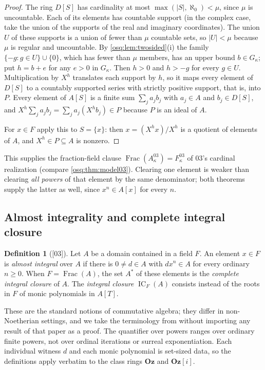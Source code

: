 \documentclass[11pt,letterpaper]{article}
\numberwithin{equation}{section}
\theoremstyle{definition}
\newtheorem{definition}[definition]{Definition}
\theoremstyle{remark}
\theoremstyle{plain}
\newcommand{\Oz}{\mathbf{Oz}}
\newcommand{\GOz}{\Oz[i]}
\newcommand{\Frac}{\operatorname{Frac}}
\newcommand{\IC}{\operatorname{IC}}
\newcommand{\src}[1]{\textup{\textsf{[#1]}}}
\begin{document}
\begin{proof}
The ring $D[S]$ has cardinality at most $\max(|S|,\aleph_0)<\mu$, since $\mu$ is
uncountable. Each of its elements has countable support (in the complex case, take the
union of the supports of the real and imaginary coordinates). The union $U$ of these
supports is a union of fewer than $\mu$ countable sets, so $|U|<\mu$ because $\mu$ is
regular and uncountable. By \cref{osq:lem:twosided}(i) the family
$\{-g:g\in U\}\cup\{0\}$, which has fewer than $\mu$ members, has an upper bound
$b\in G_\kappa$; put $h=b+e$ for any $e>0$ in $G_\kappa$. Then $h>0$ and $h>-g$ for every
$g\in U$. Multiplication by $X^h$ translates each support by $h$, so it maps every element
of $D[S]$ to a countably supported series with strictly positive support, that is, into
$P$. Every element of $A[S]$ is a finite sum $\sum_ja_jb_j$ with $a_j\in A$ and
$b_j\in D[S]$, and $X^h\sum_ja_jb_j=\sum_ja_j(X^hb_j)\in P$ because $P$ is an ideal of $A$.

For $x\in F$ apply this to $S=\{x\}$: then $x=(X^hx)/X^h$ is a quotient of elements of
$A$, and $X^h\in P\subseteq A$ is nonzero.
\end{proof}

This supplies the fraction-field clause $\Frac(A^{03}_\kappa)=F^{03}_\kappa$ of 03's
cardinal realization (compare \cref{osq:thm:model03}). Clearing one element is weaker than
clearing \emph{all powers} of that element by the same denominator; both theorems supply
the latter as well, since $x^n\in A[x]$ for every $n$.

\subsection{Almost integrality and complete integral closure}\label{osq:nm:sub:complete}

\begin{definition}[\src{03}]\label{osq:nm:def:almost}
Let $A$ be a domain contained in a field $F$. An element $x\in F$ is \emph{almost integral}
over $A$ if there is $0\ne d\in A$ with $dx^n\in A$ for every ordinary $n\ge0$. When
$F=\Frac(A)$, the set $A^*$ of these elements is the \emph{complete integral closure} of
$A$. The \emph{integral closure} $\IC_F(A)$ consists instead of the roots in $F$ of monic
polynomials in $A[T]$.
\end{definition}

These are the standard notions of commutative algebra; they differ in non-Noetherian
settings, and we take the terminology from \cite{BGR} without importing any result of
that paper as a proof. The quantifier over powers ranges over ordinary finite powers, not
over ordinal iterations or surreal exponentiation. Each individual witness $d$ and each
monic polynomial is set-sized data, so the definitions apply verbatim to the class rings
$\Oz$ and $\GOz$.
\end{document}
